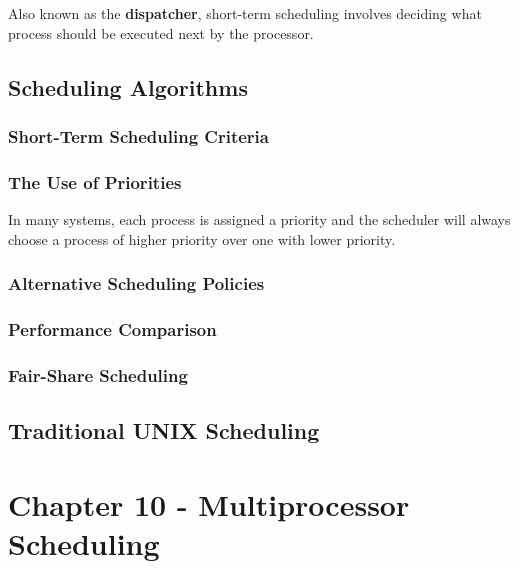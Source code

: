 \documentclass[11pt]{article}
\begin{document}
Also known as the \textbf{dispatcher}, short-term scheduling involves deciding
what process should be executed next by the processor.

\subsection{Scheduling Algorithms}
\label{sec:orgheadline95}

\subsubsection{Short-Term Scheduling Criteria}
\label{sec:orgheadline90}



\subsubsection{The Use of Priorities}
\label{sec:orgheadline91}

In many systems, each process is assigned a priority and the scheduler
will always choose a process of higher priority over one with lower priority.

\subsubsection{Alternative Scheduling Policies}
\label{sec:orgheadline92}




\subsubsection{Performance Comparison}
\label{sec:orgheadline93}



\subsubsection{Fair-Share Scheduling}
\label{sec:orgheadline94}


\subsection{Traditional UNIX Scheduling}
\label{sec:orgheadline96}


\section{Chapter 10 - Multiprocessor Scheduling}
\label{sec:orgheadline130}
\end{document}
